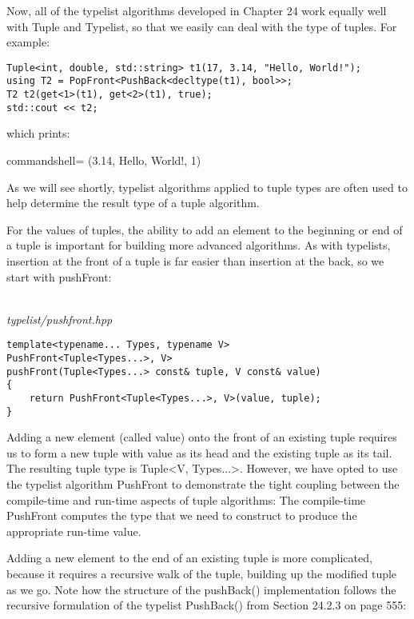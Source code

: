 Now, all of the typelist algorithms developed in Chapter 24 work equally well with Tuple and Typelist, so that we easily can deal with the type of tuples. For example:

\begin{lstlisting}[style=styleCXX]
Tuple<int, double, std::string> t1(17, 3.14, "Hello, World!");
using T2 = PopFront<PushBack<decltype(t1), bool>>;
T2 t2(get<1>(t1), get<2>(t1), true);
std::cout << t2;
\end{lstlisting}

which prints:

\begin{tcblisting}{commandshell={}}
(3.14, Hello, World!, 1)
\end{tcblisting}

As we will see shortly, typelist algorithms applied to tuple types are often used to help determine the result type of a tuple algorithm.


For the values of tuples, the ability to add an element to the beginning or end of a tuple is important for building more advanced algorithms. As with typelists, insertion at the front of a tuple is far easier than insertion at the back, so we start with pushFront:

\hspace*{\fill} \\ %
\noindent
\textit{typelist/pushfront.hpp}
\begin{lstlisting}[style=styleCXX]
template<typename... Types, typename V>
PushFront<Tuple<Types...>, V>
pushFront(Tuple<Types...> const& tuple, V const& value)
{
	return PushFront<Tuple<Types...>, V>(value, tuple);
}
\end{lstlisting}

Adding a new element (called value) onto the front of an existing tuple requires us to form a new tuple with value as its head and the existing tuple as its tail. The resulting tuple type is Tuple<V, Types...>. However, we have opted to use the typelist algorithm PushFront to demonstrate the tight coupling between the compile-time and run-time aspects of tuple algorithms: The compile-time PushFront computes the type that we need to construct to produce the appropriate run-time value.

Adding a new element to the end of an existing tuple is more complicated, because it requires a recursive walk of the tuple, building up the modified tuple as we go. Note how the structure of the pushBack() implementation follows the recursive formulation of the typelist PushBack() from Section 24.2.3 on page 555:

